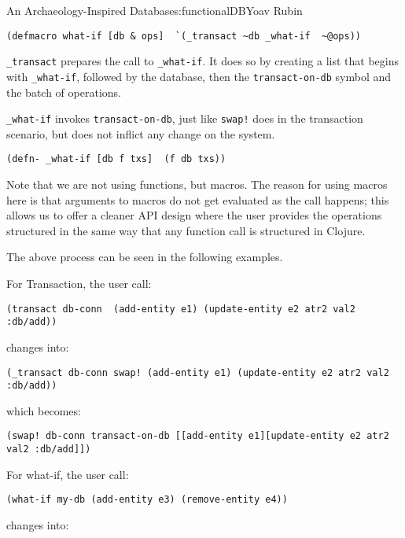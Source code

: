 \begin{aosachapter}{An Archaeology-Inspired Database}{s:functionalDB}{Yoav Rubin}
\begin{aosaitemize}
\begin{verbatim}
(defmacro what-if [db & ops]  `(_transact ~db _what-if  ~@ops))
\end{verbatim}
\item
  \texttt{\_transact} prepares the call to \texttt{\_what-if}. It does
  so by creating a list that begins with \texttt{\_what-if}, followed by
  the database, then the \texttt{transact-on-db} symbol and the batch of
  operations.
\item
  \texttt{\_what-if} invokes \texttt{transact-on-db}, just like
  \texttt{swap!} does in the transaction scenario, but does not inflict
  any change on the system.
\end{aosaitemize}

\begin{verbatim}
(defn- _what-if [db f txs]  (f db txs))
\end{verbatim}

Note that we are not using functions, but macros. The reason for using
macros here is that arguments to macros do not get evaluated as the call
happens; this allows us to offer a cleaner API design where the user
provides the operations structured in the same way that any function
call is structured in Clojure.

The above process can be seen in the following examples.

For Transaction, the user call:

\begin{verbatim}
(transact db-conn  (add-entity e1) (update-entity e2 atr2 val2 :db/add))  
\end{verbatim}

changes into:

\begin{verbatim}
(_transact db-conn swap! (add-entity e1) (update-entity e2 atr2 val2 :db/add))
\end{verbatim}

which becomes:

\begin{verbatim}
(swap! db-conn transact-on-db [[add-entity e1][update-entity e2 atr2 val2 :db/add]])
\end{verbatim}

For what-if, the user call:

\begin{verbatim}
(what-if my-db (add-entity e3) (remove-entity e4))
\end{verbatim}

changes into:


\end{aosachapter}
